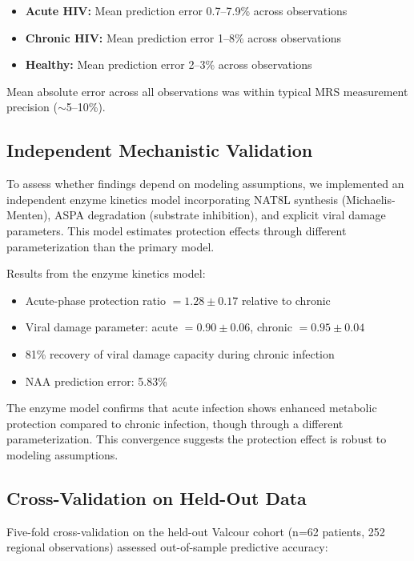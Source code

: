 \documentclass[10pt,a4paper]{article}
\begin{document}
\begin{itemize}
\item \textbf{Acute HIV:} Mean prediction error 0.7--7.9\% across observations
\item \textbf{Chronic HIV:} Mean prediction error 1--8\% across observations
\item \textbf{Healthy:} Mean prediction error 2--3\% across observations
\end{itemize}

Mean absolute error across all observations was within typical MRS measurement precision ($\sim$5--10\%).

\subsection{Independent Mechanistic Validation}

To assess whether findings depend on modeling assumptions, we implemented an independent enzyme kinetics model incorporating NAT8L synthesis (Michaelis-Menten), ASPA degradation (substrate inhibition), and explicit viral damage parameters. This model estimates protection effects through different parameterization than the primary model.

Results from the enzyme kinetics model:
\begin{itemize}
\item Acute-phase protection ratio $= 1.28 \pm 0.17$ relative to chronic
\item Viral damage parameter: acute $= 0.90 \pm 0.06$, chronic $= 0.95 \pm 0.04$
\item 81\% recovery of viral damage capacity during chronic infection
\item NAA prediction error: 5.83\%
\end{itemize}

The enzyme model confirms that acute infection shows enhanced metabolic protection compared to chronic infection, though through a different parameterization. This convergence suggests the protection effect is robust to modeling assumptions.

\subsection{Cross-Validation on Held-Out Data}

Five-fold cross-validation on the held-out Valcour cohort (n=62 patients, 252 regional observations) assessed out-of-sample predictive accuracy:
\end{document}
